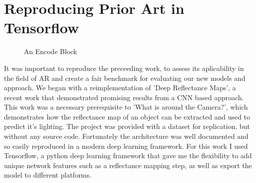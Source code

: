 \documentclass[ %
                    author={Gavin Parker},
                supervisor={Dr. Neill Campbell},
                    degree={MEng},
                     title={Deep Siamese Networks for Illumination Estimation from Stereo Images},
                  subtitle={},
                      type={research},
                      year={2018} ]{dissertation}
\begin{document}
\section{Reproducing Prior Art in Tensorflow}
\begin{figure}
\centering
{}

\caption{An Encode Block}
\label{encode}
\end{figure}
It was important to reproduce the preceeding work, to assess its aplicability in the field of AR and create a fair benchmark for evaluating our new models and approach. We began with a reimplementation of 'Deep Reflectance Maps', a recent work that demonstrated promising results from a CNN based approach. This work was a necessary prerequisite to 'What is around the Camera?', which demonstrates how the reflectance map of an object can be extracted and used to predict it's lighting. The project was provided with a dataset for replication, but without any source code. Fortunately the architecture was well documented and so easily reproduced in a modern deep learning framework. For this work I used Tensorflow, a python deep learning framework that gave me the flexibility to add unique network features such as a reflectance mapping step, as well as export the model to different platforms.

\end{document}
